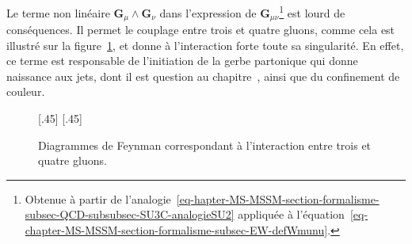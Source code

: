 \par Le terme non linéaire $\bm{G}_\mu\wedge\bm{G}_\nu$ dans l'expression de $\bm{G}_{\mu\nu}$\footnote{Obtenue à partir de l'analogie~\eqref{eq-hapter-MS-MSSM-section-formalisme-subsec-QCD-subsubsec-SU3C-analogieSU2} appliquée à l'équation~\eqref{eq-chapter-MS-MSSM-section-formalisme-subsec-EW-defWmunu}.} est lourd de conséquences.
Il permet le couplage entre trois et quatre gluons, comme cela est illustré sur la figure~\ref{fig-fgraph-QCD_3_et_4_gluons}, et donne à l'interaction forte toute sa singularité. En effet, ce terme est responsable de l'initiation de la gerbe partonique qui donne naissance aux jets, dont il est question au chapitre~, ainsi que du confinement de couleur.
\begin{figure}[h]
\centering
\vspace{\baselineskip}
\subcaptionbox{\label{subfig-fgraph-ggg}}[.45\textwidth]
{\vspace{\baselineskip}}
\hfill
\subcaptionbox{\label{subfig-fgraph-gggg}}[.45\textwidth]
{\vspace{\baselineskip}}

\caption{Diagrammes de Feynman correspondant à l'interaction entre trois et quatre gluons.}
\label{fig-fgraph-QCD_3_et_4_gluons}
\end{figure}
